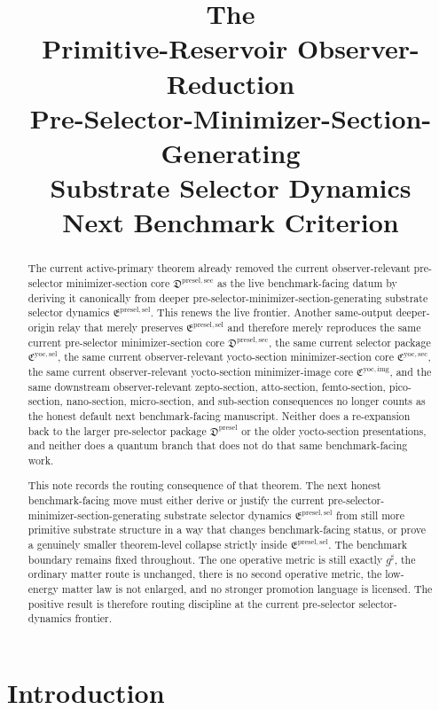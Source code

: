 \documentclass[11pt]{article}
\title{\textbf{The \TheoryName{}}\\[0.4em]
\large Primitive-Reservoir Observer-Reduction\\
\large Pre-Selector-Minimizer-Section-Generating\\
\large Substrate Selector Dynamics\\
\large Next Benchmark Criterion}
\author{}
\date{}
\newcommand{\CompletedMetric}{g^{\sharp}}
\newcommand{\PreSelectorPackage}{\mathfrak D^{\mathrm{presel}}}
\newcommand{\PreSelectorMinSectionCore}{\mathfrak D^{\mathrm{presel,sec}}}
\newcommand{\PreSectionSelectorPackage}{\mathfrak E^{\mathrm{presel,sel}}}
\newcommand{\YoctoSelectorPackage}{\mathfrak C^{\mathrm{yoc,sel}}}
\newcommand{\YoctoImageCore}{\mathfrak C^{\mathrm{yoc,img}}}
\newcommand{\YoctoMinSectionCore}{\mathfrak C^{\mathrm{yoc,sec}}}
\begin{document}
\maketitle

\begin{abstract}
The current active-primary theorem already removed the current observer-relevant pre-selector minimizer-section core \(\PreSelectorMinSectionCore\) as the live benchmark-facing datum by deriving it canonically from deeper pre-selector-minimizer-section-generating substrate selector dynamics \(\PreSectionSelectorPackage\). This renews the live frontier. Another same-output deeper-origin relay that merely preserves \(\PreSectionSelectorPackage\) and therefore merely reproduces the same current pre-selector minimizer-section core \(\PreSelectorMinSectionCore\), the same current selector package \(\YoctoSelectorPackage\), the same current observer-relevant yocto-section minimizer-section core \(\YoctoMinSectionCore\), the same current observer-relevant yocto-section minimizer-image core \(\YoctoImageCore\), and the same downstream observer-relevant zepto-section, atto-section, femto-section, pico-section, nano-section, micro-section, and sub-section consequences no longer counts as the honest default next benchmark-facing manuscript. Neither does a re-expansion back to the larger pre-selector package \(\PreSelectorPackage\) or the older yocto-section presentations, and neither does a quantum branch that does not do that same benchmark-facing work.

This note records the routing consequence of that theorem. The next honest benchmark-facing move must either derive or justify the current pre-selector-minimizer-section-generating substrate selector dynamics \(\PreSectionSelectorPackage\) from still more primitive substrate structure in a way that changes benchmark-facing status, or prove a genuinely smaller theorem-level collapse strictly inside \(\PreSectionSelectorPackage\). The benchmark boundary remains fixed throughout. The one operative metric is still exactly \(\CompletedMetric\), the ordinary matter route is unchanged, there is no second operative metric, the low-energy matter law is not enlarged, and no stronger promotion language is licensed. The positive result is therefore routing discipline at the current pre-selector selector-dynamics frontier.
\end{abstract}

\section{Introduction}
\end{document}
